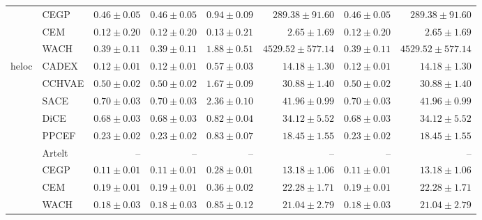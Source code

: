 \begin{table}[ht]
\begin{center}
\begin{sc}
\begin{scriptsize}
\begin{tabular}{l|l|rrrrrr}
 & CEGP & $0.46\pm{0.05}$ & $0.46\pm{0.05}$ & $0.94\pm{0.09}$ & $289.38\pm{91.60}$ & $0.46\pm{0.05}$ & $289.38\pm{91.60}$ \\
 & CEM & $\boldsymbol{0.12\pm{0.20}}$ & $\boldsymbol{0.12\pm{0.20}}$ & $\boldsymbol{0.13\pm{0.21}}$ & $2.65\pm{1.69}$ & $\boldsymbol{0.12\pm{0.20}}$ & $2.65\pm{1.69}$ \\
 & WACH & $0.39\pm{0.11}$ & $0.39\pm{0.11}$ & $1.88\pm{0.51}$ & $4529.52\pm{577.14}$ & $0.39\pm{0.11}$ & $4529.52\pm{577.14}$ \\
\midrule
\multirow{9}{*}{heloc} & CADEX & $0.12\pm{0.01}$ & $0.12\pm{0.01}$ & $0.57\pm{0.03}$ & $14.18\pm{1.30}$ & $0.12\pm{0.01}$ & $14.18\pm{1.30}$ \\
 & CCHVAE & $0.50\pm{0.02}$ & $0.50\pm{0.02}$ & $1.67\pm{0.09}$ & $30.88\pm{1.40}$ & $0.50\pm{0.02}$ & $30.88\pm{1.40}$ \\
 & SACE & $0.70\pm{0.03}$ & $0.70\pm{0.03}$ & $2.36\pm{0.10}$ & $41.96\pm{0.99}$ & $0.70\pm{0.03}$ & $41.96\pm{0.99}$ \\
 & DiCE & $0.68\pm{0.03}$ & $0.68\pm{0.03}$ & $0.82\pm{0.04}$ & $34.12\pm{5.52}$ & $0.68\pm{0.03}$ & $34.12\pm{5.52}$ \\
 & PPCEF & $0.23\pm{0.02}$ & $0.23\pm{0.02}$ & $0.83\pm{0.07}$ & $18.45\pm{1.55}$ & $0.23\pm{0.02}$ & $18.45\pm{1.55}$ \\
 & Artelt & -- & -- & -- & -- & -- & -- \\
 & CEGP & $\boldsymbol{0.11\pm{0.01}}$ & $\boldsymbol{0.11\pm{0.01}}$ & $\boldsymbol{0.28\pm{0.01}}$ & $\boldsymbol{13.18\pm{1.06}}$ & $\boldsymbol{0.11\pm{0.01}}$ & $\boldsymbol{13.18\pm{1.06}}$ \\
 & CEM & $0.19\pm{0.01}$ & $0.19\pm{0.01}$ & $0.36\pm{0.02}$ & $22.28\pm{1.71}$ & $0.19\pm{0.01}$ & $22.28\pm{1.71}$ \\
 & WACH & $0.18\pm{0.03}$ & $0.18\pm{0.03}$ & $0.85\pm{0.12}$ & $21.04\pm{2.79}$ & $0.18\pm{0.03}$ & $21.04\pm{2.79}$ \\
\bottomrule
\end{tabular}
\end{scriptsize}
\end{sc}
\end{center}
\end{table}

